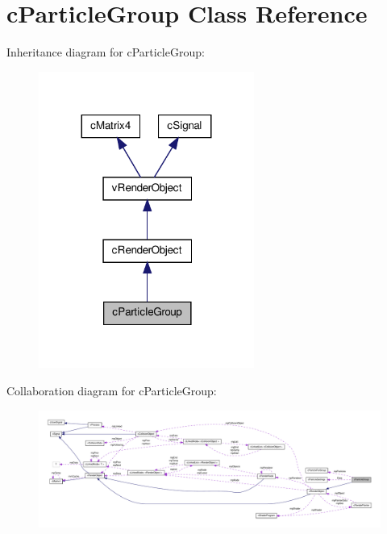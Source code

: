 \hypertarget{classc_particle_group}{
\section{cParticleGroup Class Reference}
\label{classc_particle_group}
}


Inheritance diagram for cParticleGroup:
\nopagebreak
\begin{figure}[H]
\begin{center}
\leavevmode
\includegraphics[width=200pt]{classc_particle_group__inherit__graph}
\end{center}
\end{figure}


Collaboration diagram for cParticleGroup:
\nopagebreak
\begin{figure}[H]
\begin{center}
\leavevmode
\includegraphics[width=400pt]{classc_particle_group__coll__graph}
\end{center}
\end{figure}
